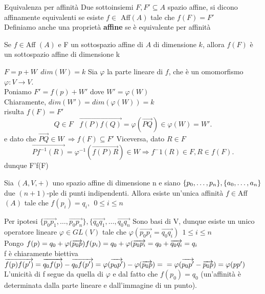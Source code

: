 \documentclass[12px]{article}
\begin{document}
\begin{defi}{Equivalenza per affinità}
		Due sottoinsiemi $F, F'\subseteq A$ spazio affine, si dicono affinamente equivalenti se esiste $f\in$ Aff$(A)$ tale che $f(F) = F'$\\
		Definiamo anche una proprietà \textbf{affine} se è equivalente per affinità
	\end{defi}
	\begin{prop}
		Se $f\in$Aff $(A)$ e F un sottospazio affine di $A$ di dimensione $k$, allora $f(F)$ è un sottospazio affine di dimensione k
	\end{prop}
	\begin{dimo} 
		$F = p + W \ \ dim(W) = k$ Sia $\varphi$ la parte lineare di $f$, che è un omomorfismo $\varphi:V \rightarrow V.$\\
		Poniamo $F' = f(p) + W'$ dove $W' = \varphi(W)$\\
		Chiaramente, $dim(W') = dim(\varphi(W)) = k$ \\
		risulta $f(F) = F'$\\ \[
		Q\in F \ \ \ \ \overrightarrow{f(P)f(Q)} = \varphi(\overrightarrow{PQ})\in \varphi(W) = W'
		.\] 
		e dato che $ \overrightarrow{PQ}\in W \ \Rightarrow f(F)\subseteq F'$
		Viceversa, dato $R\in F$ 
		\[
			\overrightarrow{Pf^{-1}(R)} = \varphi^{-1}(\overrightarrow{f(P)R})\in W \Rightarrow  f^-1(R) \in F, R\in f(F)
		.\] 
		dunque F'\subseteq f(F)
	\end{dimo}
	\begin{teo}
		Sia $(A, V, +)$ uno spazio affine di dimensione n e siano $\{p_0,\ldots,p_n\}, \\ \{a_0,\ldots,a_n\}$ due $(n+1)$-ple di punti indipendenti. Allora esiste un'unica affinità $f\in$Aff$(A)$ tale che $f(p_i) = q_i, \ \ 0\leq i\leq n$
	\end{teo}
	\begin{dimo}
		Per ipotesi $\{\overrightarrow{p_0p_1},\ldots,\overrightarrow{p_0p_n}\},\{\overrightarrow{q_0q_1}, \ldots, \overrightarrow{q_0q_n}$ Sono basi di V, dunque esiste un unico operatore lineare $\varphi\in GL(V)$ tale che $\varphi(\overrightarrow{p_0p_i} = \overrightarrow{q_0q_i}) \ \ 1\leq i\leq n$ \\
			Pongo	$f(p) = q_0 + \varphi(\overrightarrow{p_0p})\\
			f(p_i) = q_0 + \varphi(\overrightarrow{p_0p_i} = q_0 + \overrightarrow{q_0q_i} = q_i$ \\ 
			f è chiaramente biettiva
			$\overrightarrow{f(p)f(p')} = \overrightarrow{q_0f(p)} - \overrightarrow{q_0f(p')} = \varphi(\overrightarrow{p_0p'}) - \varphi(\overrightarrow{p_0p}) = \\= \varphi(\overrightarrow{p_0p'} - \overrightarrow{p_0p}) = \varphi(pp')$ \\
			L'unicità di f segue da quella di $\varphi$ e dal fatto che $f(p_0) = q_0$ (un'affinità è determinata dalla parte lineare e dall'immagine di un punto).
	\end{dimo}
\end{document}
